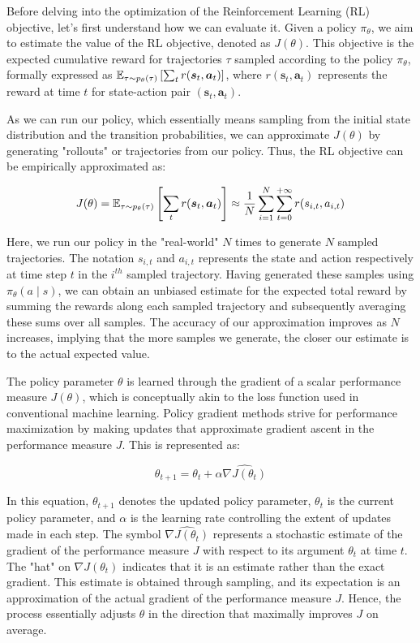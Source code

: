 Before delving into the optimization of the Reinforcement Learning (RL) objective, let's first understand how we can evaluate it. Given a policy $\pi_{\theta}$, we aim to estimate the value of the RL objective, denoted as $J(\theta)$. This objective is the expected cumulative reward for trajectories $\tau$ sampled according to the policy $\pi_{\theta}$, formally expressed as $\mathbb E_{\tau \sim p_{\theta}(\tau)} \left[ \sum_{t} r(\boldsymbol{s}_t, \boldsymbol{a}_t) \right]$, where $r(\boldsymbol{s}_t, \boldsymbol{a}_t)$ represents the reward at time $t$ for state-action pair $(\boldsymbol{s}_t, \boldsymbol{a}_t)$.

As we can run our policy, which essentially means sampling from the initial state distribution and the transition probabilities, we can approximate $J(\theta)$ by generating "rollouts" or trajectories from our policy. Thus, the RL objective can be empirically approximated as:

\begin{align}
    J(\theta) = \mathbb E_{\tau \sim p_{\theta}(\tau)} \left[ \sum_{t} r(\boldsymbol{s}_t, \boldsymbol{a}_t) \right] \approx \frac{1}{N} \sum_{i = 1}^{N} \sum_{t=0}^{+ \infty} r(s_{i,t}, a_{i,t})
\end{align}

Here, we run our policy in the "real-world" $N$ times to generate $N$ sampled trajectories. The notation $s_{i,t}$ and $a_{i,t}$ represents the state and action respectively at time step $t$ in the $i^{th}$ sampled trajectory. Having generated these samples using $\pi_{\theta}(a \mid s)$, we can obtain an unbiased estimate for the expected total reward by summing the rewards along each sampled trajectory and subsequently averaging these sums over all samples. The accuracy of our approximation improves as $N$ increases, implying that the more samples we generate, the closer our estimate is to the actual expected value.


The policy parameter $\theta$ is learned through the gradient of a scalar performance measure $J(\theta)$, which is conceptually akin to the loss function used in conventional machine learning. Policy gradient methods strive for performance maximization by making updates that approximate gradient ascent in the performance measure $J$. This is represented as:

\begin{equation}
\theta_{t+1} = \theta_t + \alpha \widehat{\nabla J(\theta_t)}
\end{equation}

In this equation, $\theta_{t+1}$ denotes the updated policy parameter, $\theta_t$ is the current policy parameter, and $\alpha$ is the learning rate controlling the extent of updates made in each step. The symbol $\widehat{\nabla J(\theta_t)}$ represents a stochastic estimate of the gradient of the performance measure $J$ with respect to its argument $\theta_t$ at time $t$. The "hat" on $\nabla J(\theta_t)$ indicates that it is an estimate rather than the exact gradient. This estimate is obtained through sampling, and its expectation is an approximation of the actual gradient of the performance measure $J$. Hence, the process essentially adjusts $\theta$ in the direction that maximally improves $J$ on average.

